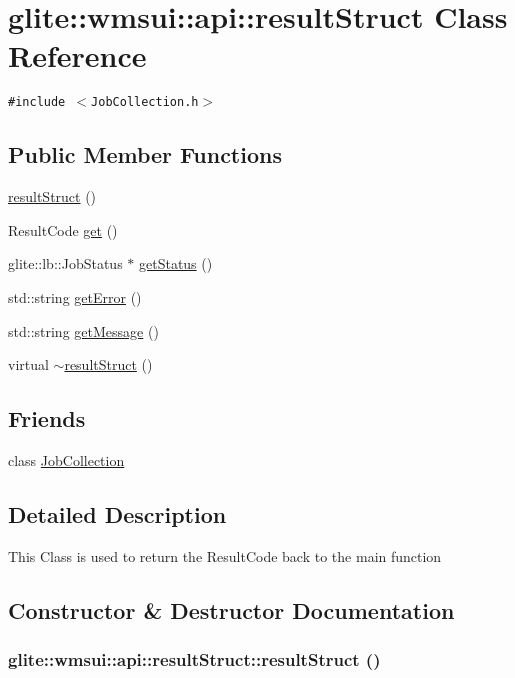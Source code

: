 \hypertarget{classglite_1_1wmsui_1_1api_1_1resultStruct}{
\section{glite::wmsui::api::result\-Struct Class Reference}
\label{classglite_1_1wmsui_1_1api_1_1resultStruct}
}
{\tt \#include $<$Job\-Collection.h$>$}

\subsection*{Public Member Functions}
\begin{CompactItemize}
\item 
\hyperlink{classglite_1_1wmsui_1_1api_1_1resultStruct_a0}{result\-Struct} ()
\item 
Result\-Code \hyperlink{classglite_1_1wmsui_1_1api_1_1resultStruct_a1}{get} ()
\item 
glite::lb::Job\-Status $\ast$ \hyperlink{classglite_1_1wmsui_1_1api_1_1resultStruct_a2}{get\-Status} ()
\item 
std::string \hyperlink{classglite_1_1wmsui_1_1api_1_1resultStruct_a3}{get\-Error} ()
\item 
std::string \hyperlink{classglite_1_1wmsui_1_1api_1_1resultStruct_a4}{get\-Message} ()
\item 
virtual \hyperlink{classglite_1_1wmsui_1_1api_1_1resultStruct_a5}{$\sim$result\-Struct} ()
\end{CompactItemize}
\subsection*{Friends}
\begin{CompactItemize}
\item 
class \hyperlink{classglite_1_1wmsui_1_1api_1_1resultStruct_n0}{Job\-Collection}
\end{CompactItemize}


\subsection{Detailed Description}
This Class is used to return the Result\-Code back to the main function 



\subsection{Constructor \& Destructor Documentation}
\hypertarget{classglite_1_1wmsui_1_1api_1_1resultStruct_a0}{
\subsubsection[resultStruct]{\setlength{\rightskip}{0pt plus 5cm}glite::wmsui::api::result\-Struct::result\-Struct ()}}
\label{classglite_1_1wmsui_1_1api_1_1resultStruct_a0}


